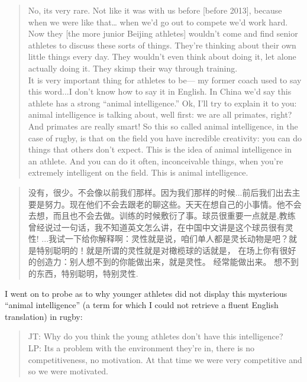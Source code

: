 \begin{CJK}{UTF8}{gbsn}
      \begin{quote}
        No, its very rare.  Not like it was with us before [before 2013], because when we were like that… when we'd go out to compete we'd work hard.  Now they [the more junior Beijing athletes] wouldn't come and find senior athletes to discuss these sorts of things.  They're thinking about their own little things every day.  They wouldn't even think about doing it, let alone actually doing it.  They skimp their way through training.  \\

        It is very important thing for athletes to be--- my former coach used to say this word...I don't know how to say it in English.  In China we'd say this athlete has a strong ``animal intelligence.'' Ok, I'll try to explain it to you: animal intelligence is talking about, well first: we are all primates, right?  And primates are really smart!  So this so called animal intelligence, in the case of rugby, is that on the field you have incredible creativity: you can do things that others don't expect.  This is the idea of animal intelligence in an athlete.  And you can do it often, inconceivable things, when you're extremely intelligent on the field. This is animal intelligence.
      \end{quote}

      \begin{quote}
        没有，很少。不会像以前我们那样。因为我们那样的时候...前后我们出去主要是努力。现在他们不会去跟老的聊这些。天天在想自己的小事情。他不会去想，而且也不会去做。训练的时候敷衍了事。球员很重要一点就是,教练曾经说过一句话，我不知道英文怎么讲，在中国中文讲是这个球员很有灵性! ...我试一下给你解释啊：灵性就是说，咱们单人都是灵长动物是吧？就是特别聪明的！就是所谓的灵性就是对橄榄球的话就是， 在场上你有很好的创造力：别人想不到的你能做出来，就是灵性。 经常能做出来。 想不到的东西，特别聪明，特别灵性.
      \end{quote}

I went on to probe as to why younger athletes did not display this mysterious ``animal intelligence'' (a term for which I could not retrieve a fluent English translation) in rugby:

\begin{quote}
      JT: Why do you think the young athletes don't have this intelligence? \\
      LP: Its a problem with the environment they're in, there is no competitiveness, no motivation.  At that time we were very competitive and so we were motivated.
\end{quote}


\end{CJK}
